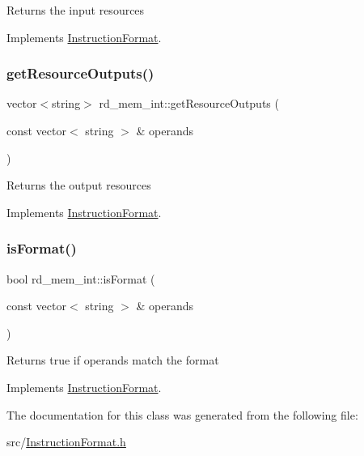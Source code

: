 Returns the input resources 

Implements \hyperlink{classInstructionFormat_a09775d3a3c22f40a0f44504664e586e4}{Instruction\+Format}.

\mbox{\label{classrd__mem__int_a73d6daee8115110da422c2dc8685c6ea}} 
\subsubsection{\texorpdfstring{get\+Resource\+Outputs()}{getResourceOutputs()}}
{\footnotesize\ttfamily vector$<$string$>$ rd\+\_\+mem\+\_\+int\+::get\+Resource\+Outputs (\begin{DoxyParamCaption}\item[{const vector$<$ string $>$ \&}]{operands }\end{DoxyParamCaption})\hspace{0.3cm}{\ttfamily [virtual]}}

Returns the output resources 

Implements \hyperlink{classInstructionFormat_a95cd28ffb1bde59b67f676880ab10536}{Instruction\+Format}.

\mbox{\label{classrd__mem__int_a7cf061c18744708846c625ccf275fc3f}} 
\subsubsection{\texorpdfstring{is\+Format()}{isFormat()}}
{\footnotesize\ttfamily bool rd\+\_\+mem\+\_\+int\+::is\+Format (\begin{DoxyParamCaption}\item[{const vector$<$ string $>$ \&}]{operands }\end{DoxyParamCaption})\hspace{0.3cm}{\ttfamily [virtual]}}

Returns true if operands match the format 

Implements \hyperlink{classInstructionFormat_a9fdcf94dcd7d9a55ba86e7a63f04d1fe}{Instruction\+Format}.



The documentation for this class was generated from the following file\+:\begin{DoxyCompactItemize}
\item 
src/\hyperlink{InstructionFormat_8h}{Instruction\+Format.\+h}\end{DoxyCompactItemize}
